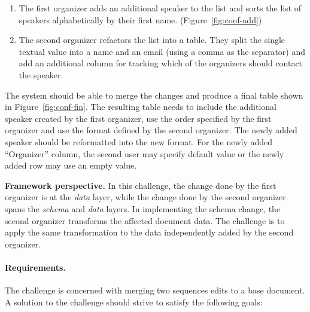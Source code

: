 \documentclass[english,submission]{programming}
\DeclareRobustCommand{\frameworkbox}[2][gray!15]{
\begin{tcolorbox}[breakable,left=3pt,right=3pt,top=3pt,bottom=3pt,colback=#1,colframe=#1,parbox=false,
  width=\dimexpr\textwidth\relax,enlarge left by=0mm,boxsep=5pt,arc=0pt,enlarge top by=0.5em,%
  outer arc=0pt]\setlength{\parskip}{0.5em}\setlength{\parindent}{0em}\textbf{\sffamily Framework perspective.}\quad #2
\end{tcolorbox}}
\begin{document}
\begin{enumerate}
\item The first organizer adds an additional speaker to the list and sorts the list of speakers
  alphabetically by their first name. (Figure~\ref{fig:conf-add})
\item The second organizer refactors the list into a table. They split the single textual value
  into a name and an email (using a comma as the separator) and add an additional column for
  tracking which of the organizers should contact the speaker.
\end{enumerate}

\noindent
The system should be able to merge the changes and produce a final table shown in
Figure~\ref{fig:conf-fin}. The resulting table needs to include the additional speaker
created by the first organizer, use the order specified by the first organizer and use
the format defined by the second organizer. The newly added speaker should be reformatted
into the new format. For the newly added ``Organizer'' column, the second user may
specify default value or the newly added row may use an empty value.

\frameworkbox{
In this challenge, the change done by the first organizer is at the \emph{data} layer,
while the change done by the second organizer spans the \emph{schema} and \emph{data} layers.
In implementing the schema change, the second organizer transforms the affected document data.
The challenge is to apply the same transformation to the data independently added by the
second organizer.
}

\paragraph{Requirements.}
The challenge is concerned with merging two sequences edits to a base document.
A solution to the challenge should strive to satisfy the following goals:
\end{document}
